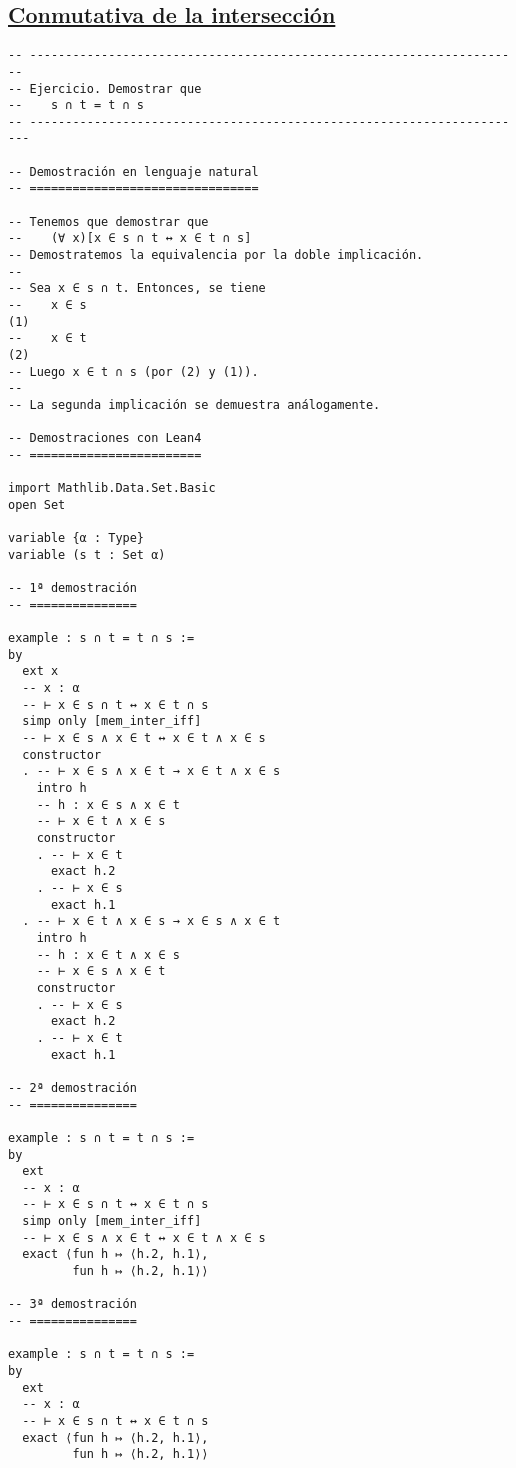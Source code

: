 \subsection{\href{./src/Conjuntos/Conmutativa\_de\_la\_interseccion.lean}{Conmutativa de la intersección}}
\label{sec:orgc0281da}
\begin{verbatim}
-- ---------------------------------------------------------------------
-- Ejercicio. Demostrar que
--    s ∩ t = t ∩ s
-- ----------------------------------------------------------------------

-- Demostración en lenguaje natural
-- ================================

-- Tenemos que demostrar que
--    (∀ x)[x ∈ s ∩ t ↔ x ∈ t ∩ s]
-- Demostratemos la equivalencia por la doble implicación.
--
-- Sea x ∈ s ∩ t. Entonces, se tiene
--    x ∈ s                                                          (1)
--    x ∈ t                                                          (2)
-- Luego x ∈ t ∩ s (por (2) y (1)).
--
-- La segunda implicación se demuestra análogamente.

-- Demostraciones con Lean4
-- ========================

import Mathlib.Data.Set.Basic
open Set

variable {α : Type}
variable (s t : Set α)

-- 1ª demostración
-- ===============

example : s ∩ t = t ∩ s :=
by
  ext x
  -- x : α
  -- ⊢ x ∈ s ∩ t ↔ x ∈ t ∩ s
  simp only [mem_inter_iff]
  -- ⊢ x ∈ s ∧ x ∈ t ↔ x ∈ t ∧ x ∈ s
  constructor
  . -- ⊢ x ∈ s ∧ x ∈ t → x ∈ t ∧ x ∈ s
    intro h
    -- h : x ∈ s ∧ x ∈ t
    -- ⊢ x ∈ t ∧ x ∈ s
    constructor
    . -- ⊢ x ∈ t
      exact h.2
    . -- ⊢ x ∈ s
      exact h.1
  . -- ⊢ x ∈ t ∧ x ∈ s → x ∈ s ∧ x ∈ t
    intro h
    -- h : x ∈ t ∧ x ∈ s
    -- ⊢ x ∈ s ∧ x ∈ t
    constructor
    . -- ⊢ x ∈ s
      exact h.2
    . -- ⊢ x ∈ t
      exact h.1

-- 2ª demostración
-- ===============

example : s ∩ t = t ∩ s :=
by
  ext
  -- x : α
  -- ⊢ x ∈ s ∩ t ↔ x ∈ t ∩ s
  simp only [mem_inter_iff]
  -- ⊢ x ∈ s ∧ x ∈ t ↔ x ∈ t ∧ x ∈ s
  exact ⟨fun h ↦ ⟨h.2, h.1⟩,
         fun h ↦ ⟨h.2, h.1⟩⟩

-- 3ª demostración
-- ===============

example : s ∩ t = t ∩ s :=
by
  ext
  -- x : α
  -- ⊢ x ∈ s ∩ t ↔ x ∈ t ∩ s
  exact ⟨fun h ↦ ⟨h.2, h.1⟩,
         fun h ↦ ⟨h.2, h.1⟩⟩


\end{verbatim}
